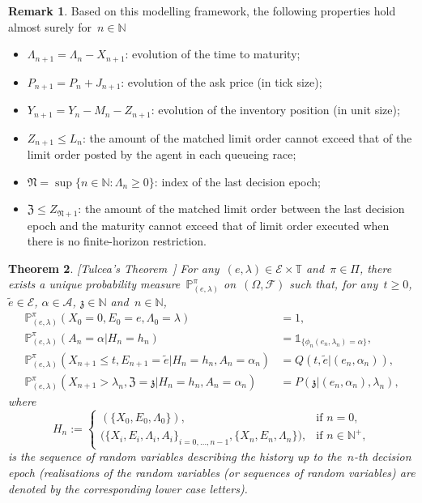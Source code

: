 \documentclass{amsart}[11pt]
\numberwithin{equation}{section}
\newtheorem{theorem}{Theorem}[section]
\theoremstyle{definition}
\newtheorem{remark}[theorem]{Remark}
\newcommand{\ind}{\mathds{1}} %
\newcommand{\PP}{\mathbb{P}}
\newcommand{\NN}{\mathbb{N}}
\newcommand{\Ee}{\mathcal{E}}
\newcommand{\Nn}{\mathfrak{N}}
\newcommand{\TT}{\mathbb{T}}
\newcommand{\ZZ}{\mathfrak{Z}}
\newcommand{\zz}{\mathfrak{z}}
\newcommand{\Aa}{\mathcal{A}}
\begin{document}
\begin{remark}\label{rmk:evolution_E}
Based on this modelling framework, the following properties hold almost surely for~$n\in\NN$
\begin{itemize}
\item $\Lambda_{n+1} = \Lambda_n - X_{n+1}$: evolution of the time to maturity;
\item $P_{n+1} = P_n + J_{n+1}$: evolution of the ask price (in tick size);
\item $Y_{n+1} = Y_n - M_n - Z_{n+1}$: evolution of the inventory position (in unit size);
\item $Z_{n+1} \leq L_{n}$:
the amount of the matched limit order cannot exceed that of the limit order posted by the agent in each queueing race;
\item $\Nn = \sup\{n\in\NN: \Lambda_n \geq 0\}$: index of the last decision epoch;
\item $\ZZ\leq Z_{\Nn+1}$: 
the amount of the matched limit order between the last decision epoch and the maturity cannot exceed that of limit order executed when there is no finite-horizon restriction.
\end{itemize}
\end{remark}
\begin{theorem}\label{thm:Tulcea}
[Tulcea's Theorem~\cite[Section 2.7.2]{ash2014real}]
For any~$(e, \lambda)\in \Ee\times\TT$ and~$\pi\in\Pi$,
there exists a unique probability measure~$\PP^{\pi}_{(e, \lambda)}$ on~$(\Omega, \mathcal{F})$ 
such that,
for any~$t\geq0$, $\tilde{e}\in \Ee$, $\alpha\in \Aa$, $\zz\in\NN$ and~$n\in\NN$,
\begin{equation*}
\begin{array}{rll}
\PP^\pi_{(e, \lambda)}(X_0 = 0, E_0 = e, \Lambda_0 = \lambda)&= 1,\\
\PP^\pi_{(e, \lambda)}(A_n = \alpha\lvert H_n = h_n)
&= \ind_{\{\phi_n(e_n, \lambda_n) = \alpha\}},
\\
\PP^\pi_{(e, \lambda)}(X_{n+1}\leq t, E_{n+1} = \tilde{e}\lvert H_n = h_n, A_n = \alpha_n)&= 
Q(t, \tilde{e}\lvert (e_n, \alpha_n)),\\
\PP^\pi_{(e, \lambda)}(X_{n+1} > \lambda_n, \ZZ = \zz\lvert H_n = h_n, A_n = \alpha_n)&= P(\zz\lvert(e_n, \alpha_n), \lambda_n),
\end{array}
\end{equation*}
where
$$
H_n := \left\{ \begin{array}{ll}
(\{X_0, E_0, \Lambda_0\}), & \text{if }n = 0,\\
\big(\{X_{i}, E_{i}, \Lambda_{i}, A_{i}\}_{i=0, \ldots, n-1}, 
\{X_n, E_n, \Lambda_n\}\big), 
& \text{if }n \in \NN^+,
\end{array}
\right.
$$
is the sequence of random variables describing the history up to the~$n$-th decision epoch
(realisations of the random variables (or sequences of random variables) are denoted by the corresponding lower case letters).
\end{theorem}
\end{document}
